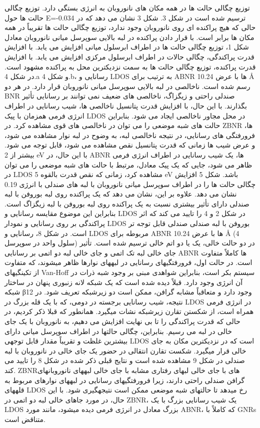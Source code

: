 توزیع چگالی حالت ها در همه مکان های نانوروبان به انرژی بستگی دارد. توزیع چگالی حالت ها حول E=-0.034 ترسیم شده است در شکل 3. شکل 3 نشان می دهد که در حالی که هیچ پراکنده ای روی نانوروبان وجود ندارد، توزیع چگالی حالت ها تقریباً در همه مکان ها برابر است. با قرار دادن پراکنده در لبه بالایی سوپرسل میانی نانوروبان معادل شکل 1، توزیع چگالی حالت ها در اطراف ابرسلول میانی افزایش می یابد. با افزایش قدرت پراکندگی، چگالی حالات در اطراف ابرسلول مرکزی افزایش می یابد. با افزایش قدرت پراکنده، توزیع چگالی حالت ها به سمت نزدیکترین محل به پراکنده مشهود است. در شکل 4.a و شکل 4.b، رسانایی و LDOS به ترتیب برای ABNR ها با عرض 10.24 Å رسم شده است. ناخالصی در لبه بالایی سوپرسل میانی نانوروبان قرار دارد. در هر دو BNR صندلی راحتی و زیگزاگ، ناخالصی های ضعیف نمی توانند بر رسانایی تأثیر بگذارند. با این حال، با افزایش قدرت پتانسیل ناخالصی ها، شیب رسانایی در اطراف انرژی فرمی همزمان با پیک LDOS در محل مجاور ناخالصی ایجاد می شود. بنابراین حالت های شبه موضعی را می توان در ناخالصی های قوی مشاهده کرد. در ZBNR ها، فرورفتگی های رسانایی، در نتیجه ناخالصی لبه، به وضوح در لبه نوار مشاهده می شود، و عرض شیب ها زمانی که قدرت پتانسیل نقص مشاهده می شود، قابل توجه می شود. بیشتر از 2 eV با این حال، در ABNR ها، یک شیب رسانایی در اطراف انرژی فرمی ظاهر می شود، جایی که یک پیک معادل، مرتبط با حالت های شبه موضعی را می توان در LDOS مشاهده کرد، زمانی که نقص قدرت بالقوه 5 eV باشد. شکل 5 افزایش چگالی حالت ها را در اطراف سوپرسل میانی نانوروبان با لبه های صندلی با انرژی 0.19 نشان می دهد. علاوه بر این، نشان می دهد که یک پراکنده روی لبه بوروفن با لبه صندلی دارای تأثیر بیشتری نسبت به یک پراکنده روی لبه بوروفن با لبه زیگزاگ است. بنابراین این موضوع مقایسه رسانایی و LDOS در شکل 2 و 4 را تایید می کند که اثر پراکندگی بر روی رسانایی و نمودار LDOS بوروفن با لبه صندلی صندلی قابل توجه تر است. در شکل 8، رسانایی و LDOS مربوطه برای ABNR ها با عرض 10.24 Å (4 سلول واحد در سوپرسل) در دو حالت خالی، یک یا دو اتم خالی ترسیم شده است. تأثیر جای خالی لبه تک اتمی و جای خالی لبه دو اتمی بر رسانایی ABNR ها کاملاً متفاوت است. در حالت اول، فرورفتگیهای رسانایی در لبههای نوارها ظاهر میشوند، که متفاوت از تکینگیهای Van-Hoff سیستم بکر است، بنابراین شواهدی مبنی بر وجود شبه ذرات در آن انرژی وجود دارد. قبلاً دیده شده است که یک شبکه لانه زنبوری پنهان در ساختار شبکه β12 وجود دارد و متعاقباً مشابه گرافن، ممکن است دو زیرشبکه تعریف شود. در نتیجه، شیب رسانایی برجسته در دومی، که با یک قله بزرگ در LDOS در انرژی فرمی همراه است، از شکستن تقارن زیرشبکه نشات میگیرد. همانطور که قبلا ذکر کردیم، در حالی که قدرت پراکندگی را تا بی نهایت افزایش می دهیم، به نانوروبان با یک جای خالی در لبه می رسیم. بنابراین، چگالی حالتها در اطراف سوپرسل میانی دارای بیشترین غلظت و تقریباً مقدار قابل توجهی LDOS است که در نزدیکترین مکان به جای خالی قرار میگیرد. شکست تقارن انتقالی در حضور یک جای خالی در نانوروبان با لبه صندلی در شکل 9 مشاهده شده است و نتایج قبلی ذکر شده در شکل 8 را تایید می کند. ZBNRهای با جای خالی لبهای رفتاری مشابه با جای خالی لبههای نانوروبانهای گرافن صندلی راحتی دارند، زیرا فرورفتگیهای رسانایی در لبههای نوارهای مربوط به قلههای LDOS رخ میدهد تا حالتهای شبه موضعی ممکن است نتیجهگیری شود. با این حال، در مورد جاهای خالی لبه دو اتمی در ZBNR، یک شیب رسانایی بزرگ با یک LDOS بزرگ معادل در انرژی فرمی دیده میشود، مانند مورد ABNR، که کاملاً با GNRs متناقض است.
